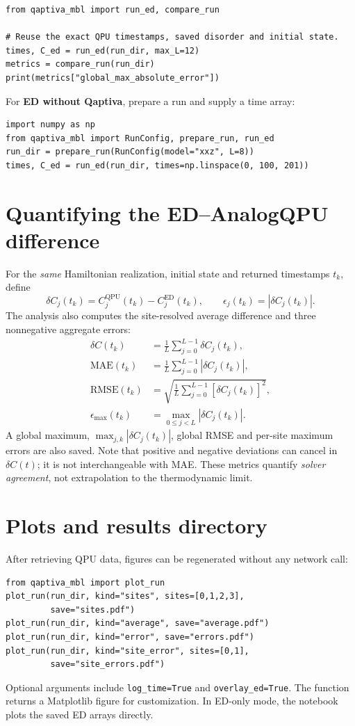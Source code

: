 \documentclass[10pt,a4paper]{article}
\begin{document}
\begin{lstlisting}
from qaptiva_mbl import run_ed, compare_run

# Reuse the exact QPU timestamps, saved disorder and initial state.
times, C_ed = run_ed(run_dir, max_L=12)
metrics = compare_run(run_dir)
print(metrics["global_max_absolute_error"])
\end{lstlisting}

For \textbf{ED without Qaptiva}, prepare a run and supply a time array:
\begin{lstlisting}
import numpy as np
from qaptiva_mbl import RunConfig, prepare_run, run_ed
run_dir = prepare_run(RunConfig(model="xxz", L=8))
times, C_ed = run_ed(run_dir, times=np.linspace(0, 100, 201))
\end{lstlisting}

\clearpage
\section{Quantifying the ED--AnalogQPU difference}
For the \emph{same} Hamiltonian realization, initial state and returned timestamps $t_k$, define
\begin{equation}
\delta C_j(t_k)=C_j^{\mathrm{QPU}}(t_k)-C_j^{\mathrm{ED}}(t_k),\qquad
\epsilon_j(t_k)=|\delta C_j(t_k)|.
\end{equation}
The analysis also computes the site-resolved average difference and three nonnegative aggregate errors:
\begin{align}
\delta C(t_k)&=\frac1L\sum_{j=0}^{L-1}\delta C_j(t_k),\\
\mathrm{MAE}(t_k)&=\frac1L\sum_{j=0}^{L-1}|\delta C_j(t_k)|,\\
\mathrm{RMSE}(t_k)&=\sqrt{\frac1L\sum_{j=0}^{L-1}[\delta C_j(t_k)]^2},\\
\epsilon_{\max}(t_k)&=\max_{0\le j<L}|\delta C_j(t_k)|.
\end{align}
A global maximum, $\max_{j,k}|\delta C_j(t_k)|$, global RMSE and per-site maximum errors are also saved. Note that positive and negative deviations can cancel in $\delta C(t)$; it is not interchangeable with MAE. These metrics quantify \emph{solver agreement}, not extrapolation to the thermodynamic limit.

\section{Plots and results directory}
After retrieving QPU data, figures can be regenerated without any network call:
\begin{lstlisting}
from qaptiva_mbl import plot_run
plot_run(run_dir, kind="sites", sites=[0,1,2,3],
         save="sites.pdf")
plot_run(run_dir, kind="average", save="average.pdf")
plot_run(run_dir, kind="error", save="errors.pdf")
plot_run(run_dir, kind="site_error", sites=[0,1],
         save="site_errors.pdf")
\end{lstlisting}
Optional arguments include \texttt{log\_time=True} and \texttt{overlay\_ed=True}. The function returns a Matplotlib figure for customization. In ED-only mode, the notebook plots the saved ED arrays directly.
\end{document}
